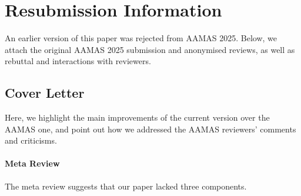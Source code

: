 \clearpage
\appendix
\section*{Resubmission Information}
An earlier version of this paper was rejected from AAMAS 2025. Below, we attach the original AAMAS 2025 submission and anonymised reviews, as well as rebuttal and interactions with reviewers. 

\subsection*{Cover Letter}
Here, we highlight the main improvements of the current version over the AAMAS one, and point out how we addressed the AAMAS reviewers' comments and criticisms.

\paragraph{Meta Review}
The meta review suggests that our paper lacked three components.
